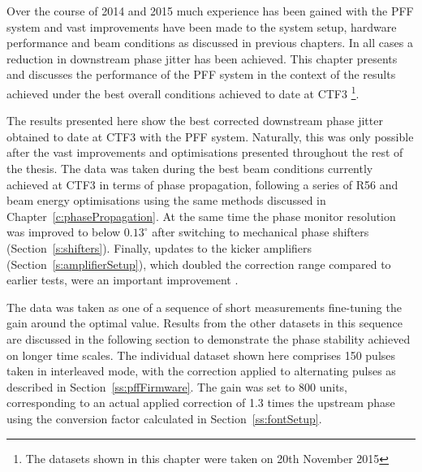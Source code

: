 
Over the course of 2014 and 2015 much experience has been gained with the PFF system and vast improvements have been made to the system setup, hardware performance and beam conditions as discussed in previous chapters. In all cases a reduction in downstream phase jitter has been achieved. This chapter presents and discusses the performance of the PFF system in the context of the results achieved under the best overall conditions achieved to date at CTF3 \footnote{The datasets shown in this chapter were taken on 20th November 2015}.




The results presented here show the best corrected downstream phase jitter obtained to date at CTF3 with the PFF system. Naturally, this was only possible after the vast improvements and optimisations presented throughout the rest of the thesis. The data was taken during the best beam conditions currently achieved at CTF3 in terms of phase propagation, following a series of R56 and beam energy optimisations using the same methods discussed in Chapter~\ref{c:phasePropagation}. %
At the same time the phase monitor resolution was improved to below \(0.13^\circ\) after switching to mechanical phase shifters (Section~\ref{s:shifters}). Finally, updates to the kicker amplifiers (Section~\ref{s:amplifierSetup}), which doubled the correction range compared to earlier tests, were an important improvement .

The data was taken as one of a sequence of short measurements fine-tuning the gain around the optimal value. Results from the other datasets in this sequence are discussed in the following section to demonstrate the phase stability achieved on longer time scales. The individual dataset shown here comprises 150 pulses taken in interleaved mode, with the correction applied to alternating pulses as described in Section~\ref{ss:pffFirmware}. The gain was set to 800 units, corresponding to an actual applied correction of 1.3 times the upstream phase using the conversion factor calculated in Section~\ref{ss:fontSetup}.

